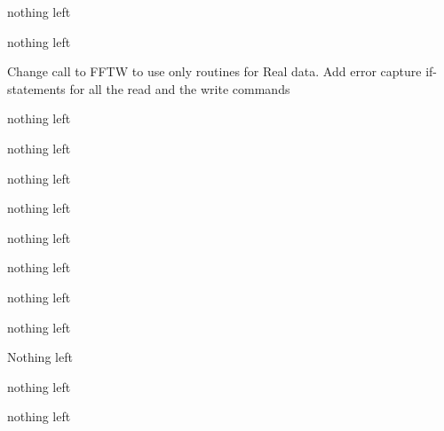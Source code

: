 
\begin{DoxyRefList}
\item[\label{todo__todo000021}%
\hypertarget{todo__todo000021}{}%
Global \hyperlink{io_8c_a835d3662188c934c07cb534f441241be}{Array\+Pad} (int Ny, int Nx, int Npad, int $\ast$i\+Row\+Start, int $\ast$i\+Col\+Start, int $\ast$\+Ny\+Pad, int $\ast$\+Nx\+Pad)]nothing left 
\item[\label{todo__todo000001}%
\hypertarget{todo__todo000001}{}%
File \hyperlink{fitscopy_8c}{fitscopy.c} ]nothing left 
\item[\label{todo__todo000012}%
\hypertarget{todo__todo000012}{}%
File \hyperlink{image2uv_8c}{image2uv.c} ]Change call to F\+F\+TW to use only routines for Real data. Add error capture if-\/statements for all the read and the write commands 
\item[\label{todo__todo000002}%
\hypertarget{todo__todo000002}{}%
File \hyperlink{imarith_8c}{imarith.c} ]nothing left 
\item[\label{todo__todo000003}%
\hypertarget{todo__todo000003}{}%
File \hyperlink{imcopy_8c}{imcopy.c} ]nothing left 
\item[\label{todo__todo000004}%
\hypertarget{todo__todo000004}{}%
File \hyperlink{imlist_8c}{imlist.c} ]nothing left 
\item[\label{todo__todo000005}%
\hypertarget{todo__todo000005}{}%
File \hyperlink{imstat_8c}{imstat.c} ]nothing left 
\item[\label{todo__todo000020}%
\hypertarget{todo__todo000020}{}%
Global \hyperlink{io_8c_a5c643255817d3e98ce8a002bec9d0007}{index\+Arr} (int i, int j, int Ny, int Nx)]nothing left 
\item[\label{todo__todo000013}%
\hypertarget{todo__todo000013}{}%
File \hyperlink{io_8c}{io.c} ]nothing left 
\item[\label{todo__todo000006}%
\hypertarget{todo__todo000006}{}%
File \hyperlink{listhead_8c}{listhead.c} ]nothing left 
\item[\label{todo__todo000007}%
\hypertarget{todo__todo000007}{}%
File \hyperlink{liststruc_8c}{liststruc.c} ]nothing left 
\item[\label{todo__todo000022}%
\hypertarget{todo__todo000022}{}%
File \hyperlink{models_image_8c}{models\+Image.c} ]Nothing left 
\item[\label{todo__todo000008}%
\hypertarget{todo__todo000008}{}%
File \hyperlink{modhead_8c}{modhead.c} ]nothing left 
\item[\label{todo__todo000017}%
\hypertarget{todo__todo000017}{}%
Global \hyperlink{io_8c_ae14d311c7a554992bda3fcf35a0c54a0}{read\+F\+I\+T\+S\+Cube} (char fname\mbox{[}\mbox{]}, int Ny, int Nx, double $\ast$\+Image)]nothing left 

\end{DoxyRefList}
